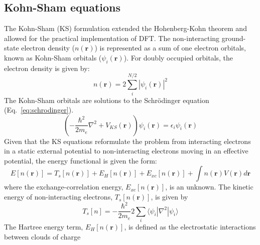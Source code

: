 \subsection{Kohn-Sham equations}
%
The Kohn-Sham (KS) formulation extended the Hohenberg-Kohn theorem and allowed for the practical implementation of DFT.\cite{kohnsham} The non-interacting ground-state electron density ($n(\mathbf{r})$) is represented as a sum of one electron orbitals, known as Kohn-Sham orbitals ($\psi_i(\mathbf{r})$). For doubly occupied orbitals, the electron density is given by:
%
\begin{equation}
n(\mathbf{r}) = 2 \sum_i^{N/2} |\psi_i(\mathbf{r})|^2
\end{equation}
%
The Kohn-Sham orbitals are solutions to the Schr\"odinger equation (Eq.~\ref{eq:schrodinger}). 
%
\begin{equation} \label{KSSchr\"odinger}
\left( - \frac{\hbar^2}{2m_e} \nabla^2 + V_{KS}(\mathbf{r}) \right) \psi_i(\mathbf{r}) = \epsilon_i \psi_i(\mathbf{r})
\end{equation}
%
%
%
%
Given that the KS equations reformulate the problem from interacting electrons in a static external potential to non-interacting electrons moving in an effective potential, the energy functional is given the form:
%
\begin{equation} \label{ksenergy}
E[n(\mathbf{r})] = T_s[n(\mathbf{r})] + E_H[n(\mathbf{r})] + E_{xc}[n(\mathbf{r})] + \int n(\mathbf{r})V(\mathbf{r}) d \mathbf{r}
\end{equation}
%
where the exchange-correlation energy, $E_{xc}[n(\mathbf{r})]$, is an unknown. The kinetic energy of non-interacting electrons, $T_s[n(\mathbf{r})]$, is given by
\begin{equation} \label{kinetic}
T_s [n]= -\frac{\hbar^2}{2m_e} 2 \sum_i \langle \psi_i|\nabla^2|\psi_i\rangle 
\end{equation}
%
The Hartree energy term, $E_H[n(\mathbf{r})]$, is defined as the electrostatic interactions between clouds of charge
